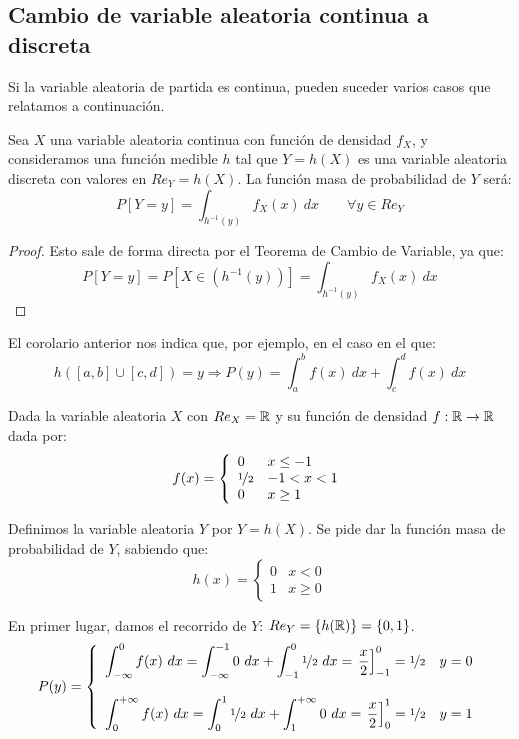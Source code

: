 \subsection{Cambio de variable aleatoria continua a discreta}
Si la variable aleatoria de partida es continua, pueden suceder varios casos que relatamos a continuación.
\begin{coro}
    Sea $X$ una variable aleatoria continua con función de densidad $f_X$, y consideramos una función medible $h$ tal que $Y=h(X)$ es una variable aleatoria discreta con valores en $Re_Y=h(X)$. La función masa de probabilidad de $Y$ será:
    $$P[Y=y] = \int_{h^{-1}(y)} f_X(x)~dx \qquad \forall y \in Re_Y$$
\end{coro}
\begin{proof}
    Esto sale de forma directa por el Teorema de Cambio de Variable, ya que:
    $$P[Y=y] = P[X\in (h^{-1}(y))] = \int_{h^{-1}(y)} f_X(x)~dx$$
\end{proof}

El corolario anterior nos indica que, por ejemplo, en el caso en el que:
$$h([a,b] \cup [c,d]) = y \Rightarrow P(y) = \int_a^b f(x)~dx + \int_c^d f(x)~dx$$

\begin{ejemplo}
    Dada la variable aleatoria $X$ con $Re_X=\mathbb R$ y su función de densidad $f:\mathbb R \rightarrow \mathbb R$ dada por:
    $$f(x) = \left\{ \begin{array}{ll}
        0   & x \leq -1  \\
        \nicefrac{1}{2} & -1 < x < 1 \\
        0   & x \geq 1
    \end{array} \right.$$
    
    
    Definimos la variable aleatoria $Y$ por $Y=h(X)$. Se pide dar la función masa de probabilidad de $Y$, sabiendo que:
    $$h(x) = \left\{ \begin{array}{ll}
        0 & x < 0    \\
        1 & x \geq 0
    \end{array} \right.$$
    
    En primer lugar, damos el recorrido de $Y$: $Re_Y = \{h(\mathbb R)\} = \{0,1\}$.
    $$P(y) = \left\{ \begin{array}{ll}
        \displaystyle \int_{-\infty}^0 f(x)~dx = \int_{-\infty}^{-1} 0~dx + \int_{-1}^0 \nicefrac{1}{2}~dx = \left.\frac{x}{2}\right]_{-1}^0 = \nicefrac{1}{2} & y=0   \\ \\
        \displaystyle \int_0^{+\infty} f(x)~dx = \int_0^1 \nicefrac{1}{2}~dx + \int_1^{+\infty} 0~dx = \left.\frac{x}{2}\right]_0^1 = \nicefrac{1}{2}          & y = 1
      \end{array} \right.$$
\end{ejemplo}

